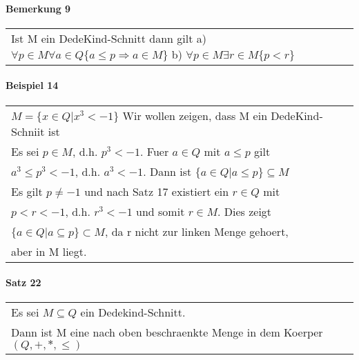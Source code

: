 \documentclass{scrartcl}
\begin{document}
\paragraph{Bemerkung 9}
\begin{tabbing}
\begin{tabular}{l}
Ist M ein DedeKind-Schnitt dann gilt
a) $\forall p\in M \forall a\in Q \{ a\leq p \Rightarrow a\in M \}$
b) $\forall p\in M \exists r\in M \{ p<r \}$
\end{tabular}
\end{tabbing}

\paragraph{Beispiel 14}
\begin{tabbing}
\begin{tabular}{l}
$M=\{ x\in Q|x^3 < -1 \}$ Wir wollen zeigen, dass M ein DedeKind-Schniit ist\\
Es sei $p\in M$, d.h. $p^3<-1$. Fuer $a\in Q$ mit $a\leq p$ gilt\\
$a^3 \leq p^3 < -1$, d.h. $a^3 < -1$. Dann ist $\{ a\in Q|a \leq p\}\subseteq M$\\
Es gilt $p \neq -1$ und nach Satz 17 existiert ein $r\in Q$ mit\\
$p < r < -1$, d.h. $r^3<-1$ und somit $r\in M$. Dies zeigt\\
$\{ a\in Q|a\subseteq p\}\subset M$, da r nicht zur linken Menge gehoert,\\
aber in M liegt.
\end{tabular}
\end{tabbing}

\paragraph{Satz 22}
\begin{tabbing}
\begin{tabular}{l}
Es sei $M \subseteq Q$ ein Dedekind-Schnitt.\\
Dann ist M eine nach oben beschraenkte Menge in dem Koerper $(Q,+,*,\leq)$\\
\end{tabular}
\end{tabbing}
\end{document}
